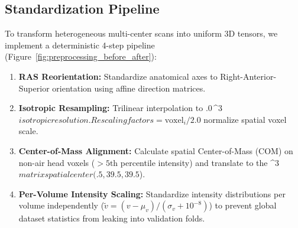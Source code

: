 \subsection{Standardization Pipeline}
\label{sec:preprocessing_pipeline}
To transform heterogeneous multi-center scans into uniform 3D tensors, we implement a deterministic 4-step pipeline (Figure~\ref{fig:preprocessing_before_after}):
\begin{enumerate}
    \item \textbf{RAS Reorientation:} Standardize anatomical axes to Right-Anterior-Superior orientation using affine direction matrices.
    \item \textbf{Isotropic Resampling:} Trilinear interpolation to .0\,^3$ isotropic resolution. Rescaling factors  = \text{voxel}_i / 2.0$ normalize spatial voxel scale.
    \item \textbf{Center-of-Mass Alignment:} Calculate spatial Center-of-Mass ($\text{COM}$) on non-air head voxels ($>5\text{th}$ percentile intensity) and translate to the ^3$ matrix spatial center (.5, 39.5, 39.5$).
    \item \textbf{Per-Volume Intensity Scaling:} Standardize intensity distributions per volume independently ($\tilde{v} = (v - \mu_v) / (\sigma_v + 10^{-8})$) to prevent global dataset statistics from leaking into validation folds.
\end{enumerate}
